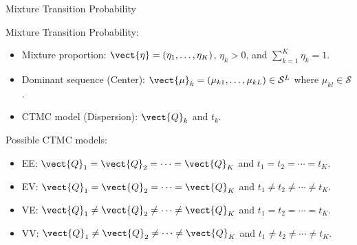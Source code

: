 \documentclass{beamer}
\begin{document}
\begin{frame}{Mixture Transition Probability}

Mixture Transition Probability:
\begin{itemize}

\item
Mixture proportion:
$\vect{\eta} = (\eta_1, \ldots, \eta_K)$, $\eta_k > 0$, and $\sum_{k = 1}^K \eta_k = 1$.

\item
Dominant sequence (Center):
$\vect{\mu}_k = (\mu_{k1}, \ldots, \mu_{kL}) \in \mathcal{S}^L$ where
$\mu_{kl} \in \mathcal{S}$.

\item
CTMC model (Dispersion): $\vect{Q}_k$ and $t_k$.
\end{itemize}

\vspace{0.2cm}
Possible CTMC models:
\begin{itemize}
\item
EE: $\vect{Q}_1 = \vect{Q}_2 = \cdots = \vect{Q}_K$
          and $t_1 = t_2 = \cdots = t_K$.
\item
EV: $\vect{Q}_1 = \vect{Q}_2 = \cdots = \vect{Q}_K$
          and $t_1 \neq t_2 \neq \cdots \neq t_K$.
\item
VE: $\vect{Q}_1 \neq \vect{Q}_2 \neq \cdots \neq \vect{Q}_K$
          and $t_1 = t_2 = \cdots = t_K$.
\item
VV: $\vect{Q}_1 \neq \vect{Q}_2 \neq \cdots \neq \vect{Q}_K$
          and $t_1 \neq t_2 \neq \cdots \neq t_K$.
\end{itemize}

\end{frame}

\end{document}
